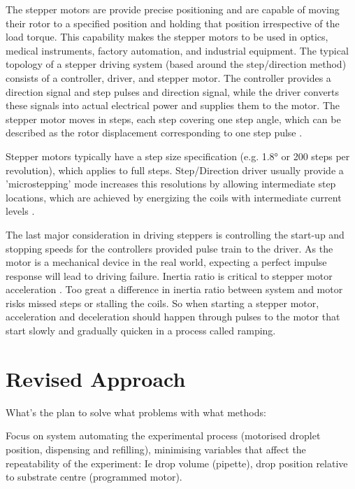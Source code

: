 The stepper motors are provide precise positioning and are capable of moving their rotor to a specified position and holding that position irrespective of the load torque. This capability makes the stepper motors to be used in optics, medical instruments, factory automation, and industrial equipment. The typical topology of a stepper driving system (based around the step/direction method) consists of a controller, driver, and stepper motor. The controller provides a direction signal and step pulses and direction signal, while the driver converts these signals into actual electrical power and supplies them to the motor. The stepper motor moves in steps, each step covering one step angle, which can be described as the rotor displacement corresponding to one step pulse \cite{step_app}.

Stepper motors typically have a step size specification (e.g. 1.8° or 200 steps per revolution), which applies to full steps. Step/Direction driver usually provide a 'microstepping' mode increases this resolutions by allowing intermediate step locations, which are achieved by energizing the coils with intermediate current levels \cite{step_book}.

The last major consideration in driving steppers is controlling the start-up and stopping speeds for the controllers provided pulse train to the driver. As the motor is a mechanical device in the real world, expecting a perfect impulse response will lead to driving failure. Inertia ratio is critical to stepper motor acceleration \cite{step_book}. Too great a difference in inertia ratio between system and motor risks missed steps or stalling the coils. So when starting a stepper motor, acceleration and deceleration should happen through pulses to the motor that start slowly and gradually quicken in a process called ramping.

\section{Revised Approach}
What's the plan to solve what problems with what methods:

Focus on system automating the experimental process (motorised droplet position, dispensing and refilling), minimising variables that affect the repeatability of the experiment: Ie drop volume (pipette), drop position relative to substrate centre (programmed motor).
